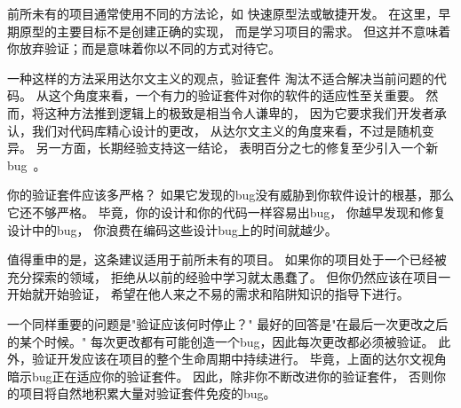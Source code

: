 前所未有的项目通常使用不同的方法论，如
快速原型法或敏捷开发。
在这里，早期原型的主要目标不是创建正确的实现，
而是学习项目的需求。
但这并不意味着你放弃验证；而是意味着你以不同的方式对待它。

一种这样的方法采用达尔文主义的观点，验证套件
淘汰不适合解决当前问题的代码。
从这个角度来看，一个有力的验证套件对你的软件的适应性至关重要。
然而，将这种方法推到逻辑上的极致是相当令人谦卑的，
因为它要求我们开发者承认，我们对代码库精心设计的更改，
从达尔文主义的角度来看，不过是随机变异。
另一方面，长期经验支持这一结论，
表明百分之七的修复至少引入一个新bug~\cite{RexBlack2012SQA}。

你的验证套件应该多严格？
如果它发现的bug没有威胁到你软件设计的根基，那么它还不够严格。
毕竟，你的设计和你的代码一样容易出bug，
你越早发现和修复设计中的bug，
你浪费在编码这些设计bug上的时间就越少。

\QuickQuizEnd

值得重申的是，这条建议适用于前所未有的项目。
如果你的项目处于一个已经被充分探索的领域，
拒绝从以前的经验中学习就太愚蠢了。
但你仍然应该在项目一开始就开始验证，
希望在他人来之不易的需求和陷阱知识的指导下进行。

一个同样重要的问题是"验证应该何时停止？"
最好的回答是"在最后一次更改之后的某个时候。"
每次更改都有可能创造一个bug，因此每次更改都必须被验证。
此外，验证开发应该在项目的整个生命周期中持续进行。
毕竟，上面的达尔文视角暗示bug正在适应你的验证套件。
因此，除非你不断改进你的验证套件，
否则你的项目将自然地积累大量对验证套件免疫的bug。


